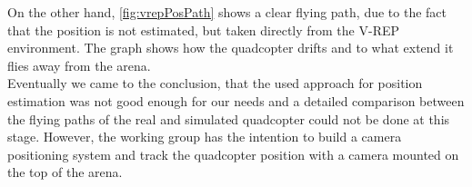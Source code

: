 On the other hand, \ref{fig:vrepPosPath} shows a clear flying path, due to the fact that the position is not estimated, but taken directly from the V-REP environment. 
The graph shows how the quadcopter drifts and to what extend it flies away from the arena.\\

Eventually we came to the conclusion, that the used approach for position estimation was not good enough for our needs and a detailed comparison between the flying paths of the real and simulated quadcopter could not be done at this stage. 
However, the working group has the intention to build a camera positioning system and track the quadcopter position with a camera mounted on the top of the arena.


